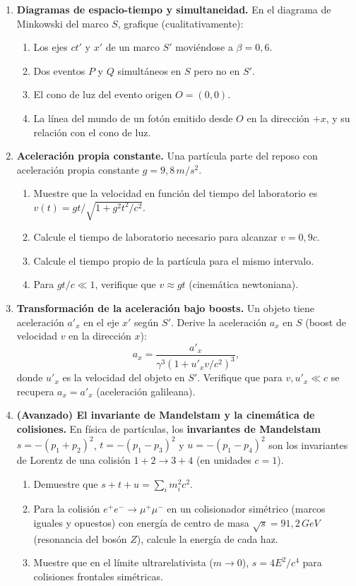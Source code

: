 \begin{enumerate}[leftmargin=2em, label=\textbf{P\thechapter.\arabic*.}]
  \item \textbf{Diagramas de espacio-tiempo y simultaneidad.}
  En el diagrama de Minkowski del marco $S$, grafique (cualitativamente):
  \begin{enumerate}[label=(\alph*)]
    \item Los ejes $ct'$ y $x'$ de un marco $S'$ moviéndose a $\beta = 0{,}6$.
    \item Dos eventos $P$ y $Q$ simultáneos en $S$ pero no en $S'$.
    \item El cono de luz del evento origen $O = (0,0)$.
    \item La línea del mundo de un fotón emitido desde $O$ en la dirección $+x$, y su relación con el cono de luz.
  \end{enumerate}

  \item \textbf{Aceleración propia constante.}
  Una partícula parte del reposo con aceleración propia constante $g = 9{,}8\,\si{m/s^2}$.
  \begin{enumerate}[label=(\alph*)]
    \item Muestre que la velocidad en función del tiempo del laboratorio es $v(t) = gt/\sqrt{1+g^2t^2/c^2}$.
    \item Calcule el tiempo de laboratorio necesario para alcanzar $v = 0{,}9c$.
    \item Calcule el tiempo propio de la partícula para el mismo intervalo.
    \item Para $gt/c \ll 1$, verifique que $v \approx gt$ (cinemática newtoniana).
  \end{enumerate}

  \item \textbf{Transformación de la aceleración bajo boosts.}
  Un objeto tiene aceleración $a'_x$ en el eje $x'$ según $S'$. Derive la aceleración $a_x$ en $S$ (boost de velocidad $v$ en la dirección $x$):
  \[
    a_x = \frac{a'_x}{\gamma^3\left(1 + u'_x v/c^2\right)^3},
  \]
  donde $u'_x$ es la velocidad del objeto en $S'$. Verifique que para $v, u'_x \ll c$ se recupera $a_x = a'_x$ (aceleración galileana).

  \item \textbf{(Avanzado) El invariante de Mandelstam y la cinemática de colisiones.}
  En física de partículas, los \textbf{invariantes de Mandelstam} $s = -(p_1+p_2)^2$, $t = -(p_1-p_3)^2$ y $u = -(p_1-p_4)^2$ son los invariantes de Lorentz de una colisión $1+2\to 3+4$ (en unidades $c=1$).
  \begin{enumerate}[label=(\alph*)]
    \item Demuestre que $s + t + u = \sum_i m_i^2 c^2$.
    \item Para la colisión $e^+e^- \to \mu^+\mu^-$ en un colisionador simétrico (marcos iguales y opuestos) con energía de centro de masa $\sqrt{s} = 91{,}2\,\si{GeV}$ (resonancia del bosón $Z$), calcule la energía de cada haz.
    \item Muestre que en el límite ultrarelativista ($m \to 0$), $s = 4E^2/c^4$ para colisiones frontales simétricas.
  \end{enumerate}

\end{enumerate}
